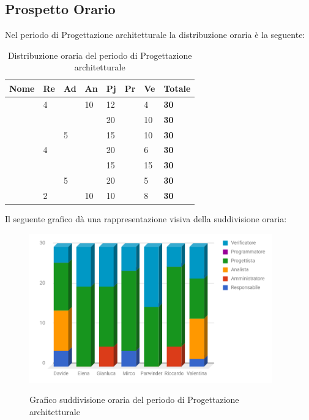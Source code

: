 \documentclass[PianoDiProgetto.tex]{subfiles}
\begin{document}
\subsection{Prospetto Orario}
Nel periodo di Progettazione architetturale la distribuzione oraria è la seguente:
\begin{center}
\begin{table}[htbp]
	\centering
	\renewcommand\arraystretch{1.5}
	\begin{tabularx}{\textwidth}{p{4cm}|p{1cm}|p{1cm}|p{1cm}|p{1cm}|p{1cm}|p{1cm}|p{2cm}}
		\hline
		\textbf{Nome} & \textbf{Re} & \textbf{Ad} & \textbf{An} & \textbf{Pj} & \textbf{Pr} & \textbf{Ve} & \textbf{Totale} \\
		\hline
		\Davide & 4 & \ & 10 & 12 & \ & 4 & \textbf{30} \\
		\hline
		\Elena & \ & \ & \ & 20 & \ & 10 & \textbf{30} \\
		\hline
		\Gianluca & \ & 5 & \ & 15 & \ & 10 & \textbf{30} \\
		\hline
		\Mirco & 4 & \ & \ & 20 & \ & 6 & \textbf{30} \\
		\hline
		\Parwinder & \ & \ & \ & 15 & \ & 15 & \textbf{30} \\
		\hline
		\Riccardo & \ & 5 & \ & 20 & \ & 5 & \textbf{30} \\
		\hline
		\Valentina & 2 & \ & 10 & 10 & \ & 8 & \textbf{30} \\
		\hline
	\end{tabularx}
	\caption{Distribuzione oraria del periodo di Progettazione architetturale}
	\label{my-label}
\end{table}
\end{center}
Il seguente grafico dà una rappresentazione visiva della suddivisione oraria:
\begin{figure}[h]
	\centering
	\includegraphics[width=10.5cm]{images/prospettoOrario/progArch.png}
	\label{fig:foo}
	\caption{Grafico suddivisione oraria del periodo di Progettazione architetturale}
\end{figure} 
\newpage
\end{document}
